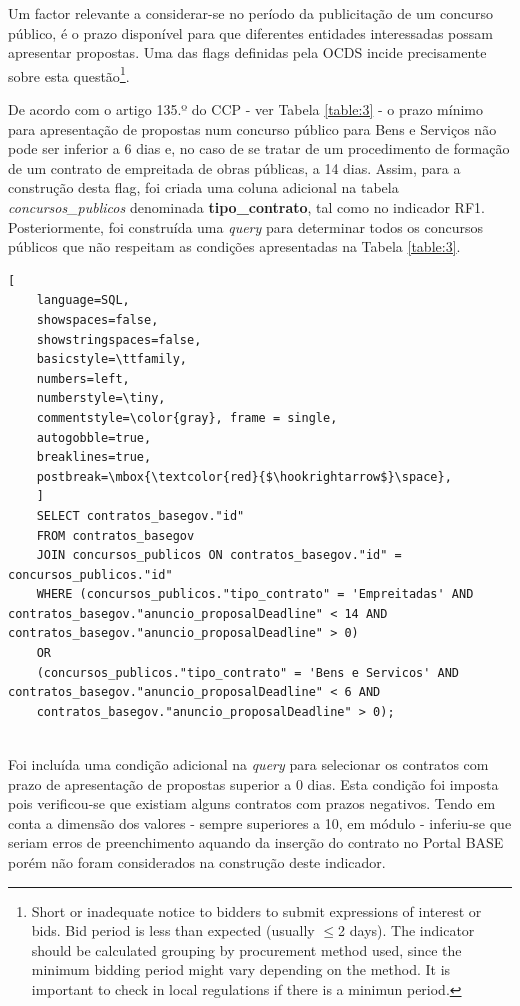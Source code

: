 Um factor relevante a considerar-se no período da publicitação de um concurso público, é o prazo disponível para que diferentes entidades interessadas possam apresentar propostas. Uma das flags definidas pela OCDS incide precisamente sobre esta questão\footnote{Short or inadequate notice to bidders to submit expressions of interest or bids. Bid period is less than expected (usually $\leq$2 days). The indicator should be calculated grouping by procurement method used, since the minimum bidding period might vary depending on the method.  It is important to check in local regulations if there is a minimun period.}.


De acordo com o artigo 135.º do CCP - ver Tabela \ref{table:3} - o prazo mínimo para apresentação de propostas num concurso público para Bens e Serviços não pode ser inferior a 6 dias e, no caso de se tratar de um procedimento de formação de um contrato de empreitada de obras públicas, a 14 dias. Assim, para a construção desta flag, foi criada uma coluna adicional na tabela \textit{concursos\_publicos} denominada \textbf{tipo\_contrato}, tal como no indicador RF1. Posteriormente, foi construída uma \textit{query} para determinar todos os concursos públicos que não respeitam as condições apresentadas na Tabela \ref{table:3}. \\


\begin{lstlisting}[
	language=SQL,
	showspaces=false,
	showstringspaces=false,
	basicstyle=\ttfamily,
	numbers=left,
	numberstyle=\tiny,
	commentstyle=\color{gray}, frame = single,
	autogobble=true,
	breaklines=true,
	postbreak=\mbox{\textcolor{red}{$\hookrightarrow$}\space},
	]
	SELECT contratos_basegov."id" 
	FROM contratos_basegov
	JOIN concursos_publicos ON contratos_basegov."id" = concursos_publicos."id"
	WHERE (concursos_publicos."tipo_contrato" = 'Empreitadas' AND contratos_basegov."anuncio_proposalDeadline" < 14 AND contratos_basegov."anuncio_proposalDeadline" > 0) 
	OR
	(concursos_publicos."tipo_contrato" = 'Bens e Servicos' AND contratos_basegov."anuncio_proposalDeadline" < 6 AND
	contratos_basegov."anuncio_proposalDeadline" > 0);
	
\end{lstlisting}


Foi incluída uma condição adicional na \textit{query} para selecionar os contratos com prazo de apresentação de propostas superior a 0 dias. Esta condição foi imposta pois verificou-se que existiam alguns contratos com prazos negativos. Tendo em conta a dimensão dos valores - sempre superiores a 10, em módulo - inferiu-se que seriam erros de preenchimento aquando da inserção do contrato no Portal BASE porém não foram considerados na construção deste indicador. 


